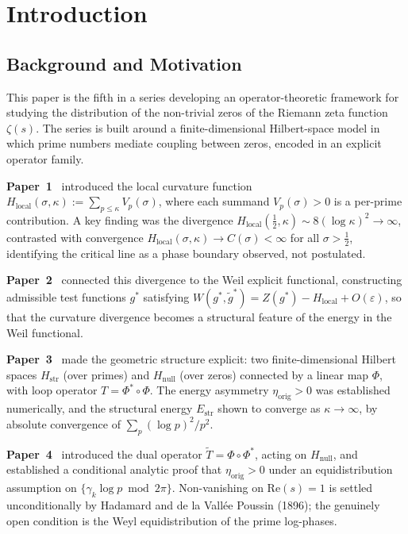 \documentclass[11pt]{article}
\newcommand{\Hstr}{H_{\mathrm{str}}}
\newcommand{\Hnull}{H_{\mathrm{null}}}
\newcommand{\Estr}{E_{\mathrm{str}}}
\newcommand{\etaorig}{\eta_{\mathrm{orig}}}
\newcommand{\Tt}{\widetilde{T}}
\newcommand{\Hlocal}{H_{\mathrm{local}}}
\begin{document}
\section{Introduction}
\label{sec:intro}

\subsection{Background and Motivation}

This paper is the fifth in a series developing an operator-theoretic
framework for studying the distribution of the non-trivial zeros of the
Riemann zeta function $\zeta(s)$. The series is built around a
finite-dimensional Hilbert-space model in which prime numbers
mediate coupling between zeros, encoded in an explicit operator family.

\textbf{Paper~1}~\cite{Paper1} introduced the local curvature function
$\Hlocal(\sigma,\kappa) := \sum_{p\leq\kappa}V_p(\sigma)$,
where each summand $V_p(\sigma)>0$ is a per-prime contribution.
A key finding was the divergence
$\Hlocal(\tfrac{1}{2},\kappa)\sim 8(\log\kappa)^2\to\infty$,
contrasted with convergence $\Hlocal(\sigma,\kappa)\to C(\sigma)<\infty$
for all $\sigma>\tfrac{1}{2}$, identifying the critical line as a phase
boundary observed, not postulated.

\textbf{Paper~2}~\cite{Paper2} connected this divergence to the Weil
explicit functional, constructing admissible test functions $g^*$
satisfying $W(g^*,\tilde{g}^*)= Z(g^*)-\Hlocal+O(\varepsilon)$,
so that the curvature divergence becomes a structural feature of
the energy in the Weil functional.

\textbf{Paper~3}~\cite{Paper3} made the geometric structure explicit:
two finite-dimensional Hilbert spaces $\Hstr$ (over primes) and
$\Hnull$ (over zeros) connected by a linear map $\Phi$, with loop
operator $T=\Phi^*\circ\Phi$.
The energy asymmetry $\etaorig>0$ was established numerically, and
the structural energy $\Estr$ shown to converge as $\kappa\to\infty$,
by absolute convergence of $\sum_p(\log p)^2/p^2$.

\textbf{Paper~4}~\cite{Paper4} introduced the dual operator
$\Tt=\Phi\circ\Phi^*$, acting on $\Hnull$, and established a
conditional analytic proof that $\etaorig>0$ under an equidistribution
assumption on $\{\gamma_k\log p\bmod 2\pi\}$.
Non-vanishing on $\mathrm{Re}(s)=1$ is settled unconditionally by
Hadamard and de la Vall\'ee Poussin (1896); the genuinely open
condition is the Weyl equidistribution of the prime log-phases.
\end{document}

